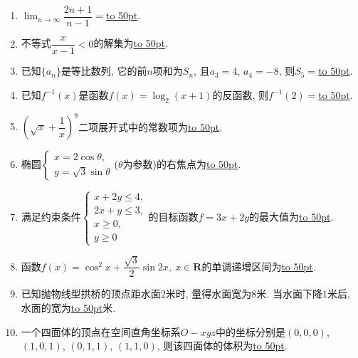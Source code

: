 \documentclass[10pt,a4paper]{article}
\newcommand{\blank}[1]{\underline{\hbox to #1pt{}}}
\begin{document}
\begin{enumerate}[1.]
\item $\displaystyle\lim_{n\to \infty}\dfrac{2n+1}{n-1}=$\blank{50}. 
\item 不等式$\dfrac x{x-1}<0$的解集为\blank{50}.
\item 已知$\{a_n\}$是等比数列, 它的前$n$项和为$S_n$, 且$a_3=4$, $a_4=-8$, 则$S_5=$\blank{50}.
\item 已知$f^{-1}(x)$是函数$f(x)=\log_2(x+1)$的反函数, 则$f^{-1}(2)=$\blank{50}.
\item $(\sqrt x+\dfrac1x)^9$二项展开式中的常数项为\blank{50}.
\item 椭圆$\begin{cases} x=2 \cos\theta, \\ y=\sqrt3\sin\theta  \end{cases}$($\theta$为参数)的右焦点为\blank{50}.
\item 满足约束条件$\begin{cases} x+2y\le 4, \\ 2x+y\le 3, \\ x\ge 0, \\ y\ge 0 \end{cases}$的目标函数$f=3x+2y$的最大值为\blank{50}.
\item 函数$f(x)=\cos^2 x+\dfrac{\sqrt3}2\sin 2x,\ x\in \mathbf{R}$的单调递增区间为\blank{50}.
\item 已知抛物线型拱桥的顶点距水面$2$米时, 量得水面宽为$8$米. 当水面下降$1$米后, 水面的宽为\blank{50}米.
\item 一个四面体的顶点在空间直角坐标系$O-xyz$中的坐标分别是$(0,0,0)$, $(1,0,1)$, $(0,1,1)$, $(1,1,0)$, 则该四面体的体积为\blank{50}.



\end{enumerate}
\end{document}
